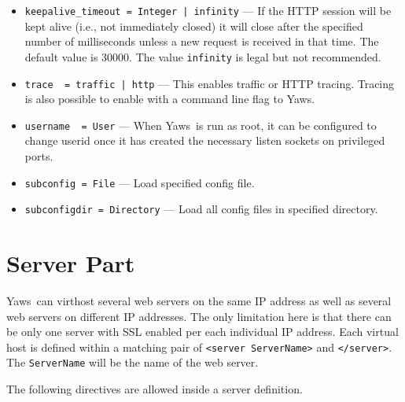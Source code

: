 \documentclass[11pt,oneside,english]{book}
\newcommand{\Yaws}            %
        {{\sc Yaws}}
\begin{document}
\begin{itemize}
\item        \verb+keepalive_timeout = Integer | infinity+ ---
              If the HTTP session will be kept alive (i.e., not
              immediately closed) it will close after the specified
              number of milliseconds unless a new request is received
              in that time. The default value is 30000. The value
              \verb+infinity+ is legal but not recommended.

\item        \verb+trace  = traffic | http+ ---
              This  enables  traffic  or HTTP tracing. Tracing is
              also possible to enable with a command line flag to
              \Yaws{}.

\item        \verb+username  = User+ ---
             When \Yaws\  is run as root, it can be configured to
             change userid once it has created the necessary
             listen sockets on privileged ports.

\item        \verb+subconfig = File+ ---
             Load specified config file.

\item        \verb+subconfigdir = Directory+ ---
             Load all config files in specified directory.

\end{itemize}



\section{Server Part}

\Yaws\ can virthost several web servers on the same IP address as well
as several web servers on different IP addresses.  The only limitation
here is that there can be only one server with SSL enabled per each
individual IP address.  Each virtual host is defined within a matching
pair of \verb+<server ServerName>+ and \verb+</server>+.  The
\verb+ServerName+ will be the name of the web server.

The following directives are allowed inside a server definition.
\end{document}

